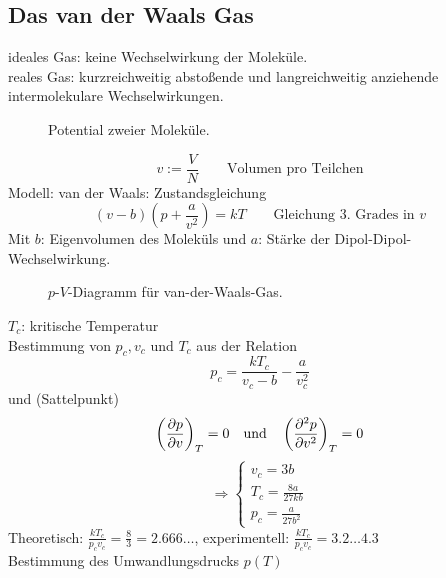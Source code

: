 \subsection{Das van der Waals Gas}
ideales Gas: keine Wechselwirkung der Moleküle.\\
reales Gas: kurzreichweitig abstoßende und langreichweitig anziehende intermolekulare Wechselwirkungen.

\begin{figure}[H]
        \centering
        \def\svgwidth{0.5\textwidth}
        
        \caption{Potential zweier Moleküle.}
        \label{img:UvanderWaals}
\end{figure}

\begin{equation}
    v := \frac{V}{N} \qquad \text{Volumen pro Teilchen}
\end{equation}
Modell: van der Waals: Zustandsgleichung
\begin{equation}
    (v-b) \left( p+\frac{a}{v^2} \right) = k T \qquad \text{Gleichung 3. Grades in }v
\end{equation}
Mit $b$: Eigenvolumen des Moleküls und $a$: Stärke der Dipol-Dipol-Wechselwirkung.

\begin{figure}[H]
        \centering
        \def\svgwidth{0.5\textwidth}
        
        \caption{$p$-$V$-Diagramm für van-der-Waals-Gas.}
        \label{img:label}
\end{figure}

$T_c$: kritische Temperatur \\
Bestimmung von $p_c, v_c$ und $T_c$ aus der Relation
\begin{equation}
    p_c = \frac{k T_c}{v_c - b} - \frac{a}{v_c^2}
\end{equation}
und (Sattelpunkt)
\begin{equation}
    \left( \frac{\partial p}{\partial v} \right)_{T} = 0 \quad \text{und} \quad \left( \frac{\partial^2 p}{\partial v^2} \right)_T = 0
\end{equation}
\begin{equation}
    \Rightarrow
    \begin{cases}
        v_c = 3 b \\
        T_c = \frac{8 a}{27 k b} \\
        p_c = \frac{a}{27 b^2}
    \end{cases}
\end{equation}
Theoretisch: $\frac{k T_c}{p_c v_c} = \frac{8}{3} = 2.666\ldots$, experimentell: $\frac{k T_c}{p_c v_c} = 3.2 \ldots 4.3$ \\
Bestimmung des Umwandlungsdrucks $p(T)$

